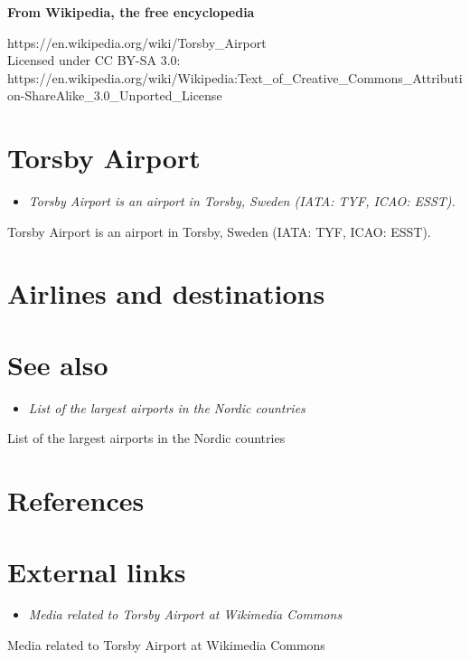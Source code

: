 \textbf{From Wikipedia, the free encyclopedia}

https://en.wikipedia.org/wiki/Torsby\_Airport\\
Licensed under CC BY-SA 3.0:\\
https://en.wikipedia.org/wiki/Wikipedia:Text\_of\_Creative\_Commons\_Attribution-ShareAlike\_3.0\_Unported\_License

\section{Torsby Airport}\label{torsby-airport}

\begin{itemize}
\item
  \emph{Torsby Airport is an airport in Torsby, Sweden (IATA: TYF, ICAO:
  ESST).}
\end{itemize}

Torsby Airport is an airport in Torsby, Sweden (IATA: TYF, ICAO: ESST).

\section{Airlines and destinations}\label{airlines-and-destinations}

\section{See also}\label{see-also}

\begin{itemize}
\item
  \emph{List of the largest airports in the Nordic countries}
\end{itemize}

List of the largest airports in the Nordic countries

\section{References}\label{references}

\section{External links}\label{external-links}

\begin{itemize}
\item
  \emph{Media related to Torsby Airport at Wikimedia Commons}
\end{itemize}

Media related to Torsby Airport at Wikimedia Commons
